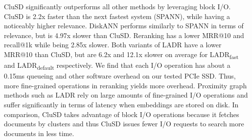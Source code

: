 CluSD significantly outperforms all other methods by leveraging block I/O.
CluSD is 2.2x faster than the next fastest system (SPANN), while having a noticeably higher relevance.
DiskANN performs similarly to SPANN in terms of relevance, but is 4.97x slower than CluSD.
Reranking has a lower MRR@10 and recall@1k while being 2.85x slower.
Both variants of LADR have a lower MRR@10 than CluSD, but are 6.2x and 12.1x slower on average for LADR\textsubscript{fast} and LADR\textsubscript{default} respectively.
We find that  each  I/O operation has about a 0.15ms queueing and other software overhead on our tested PCIe SSD.
Thus, more fine-grained operations in reranking yields more overhead.
Proximity graph methods such as LADR rely on large amounts of fine-grained I/O operations and suffer significantly in terms of latency when embeddings are stored on disk.
In comparison, CluSD takes advantage of block I/O operations
because it fetches documents by clusters  and thus CluSD issues fewer I/O requests to search more documents in less time.





                                     


